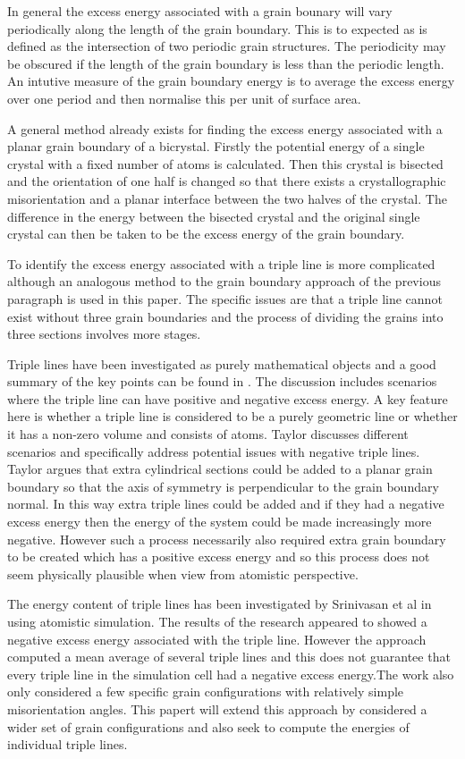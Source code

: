 \documentclass[12pt,a4paper]{book}
\begin{document}
In general the excess energy associated with a grain bounary will vary periodically along the length of the grain boundary. This is to expected as is defined as the intersection of two periodic grain structures. The periodicity may be obscured if the length of the grain boundary is less than the periodic length. An intutive measure of the grain boundary energy is to average the excess energy over one period and then normalise this per unit of surface area.

A general method already exists for finding the excess energy associated with a planar grain boundary of a bicrystal. Firstly the potential energy of a single crystal with a fixed number of atoms is calculated. Then this crystal is bisected and the orientation of one half is changed so that there exists a crystallographic misorientation and a planar interface between the two halves of the crystal. The difference in the energy between the bisected crystal and the original single crystal can then be taken to be the excess energy of the grain boundary.

To identify the excess energy associated with a triple line is more complicated although an analogous method to the grain boundary approach of the previous paragraph is used in this paper. The specific issues are that a triple line cannot exist without three grain boundaries and the process of dividing the grains into three sections involves more stages.

Triple lines have been investigated as purely mathematical objects and a good summary of the key points can be found in \cite{Taylor1999}. The discussion includes scenarios where the triple line can have positive and negative excess energy. A key feature here is whether a triple line is considered to be a purely geometric line or whether it has a non-zero volume and consists of atoms. Taylor discusses different scenarios and specifically address potential issues with negative triple lines. Taylor argues that extra cylindrical sections could be added to a planar grain boundary so that the axis of symmetry is perpendicular to the grain boundary normal. In this way extra triple lines could be added and if they had a negative excess energy then the energy of the system could be made increasingly more negative. However such a process necessarily also required extra grain boundary to be created which has a positive excess energy and so this process does not seem physically plausible when view from atomistic perspective.


The energy content of triple lines has been investigated by Srinivasan et al in \cite{Srinivasan1999} using atomistic simulation. The results of the research appeared to showed a negative excess energy associated with the triple line. However the approach computed a mean average of several triple lines and this does not guarantee that every triple line in the simulation cell had a negative excess energy.The work also only considered a few specific grain configurations with relatively simple misorientation angles. This papert will extend this approach by considered a wider set of grain configurations and also seek to compute the energies of individual triple lines.
\end{document}
